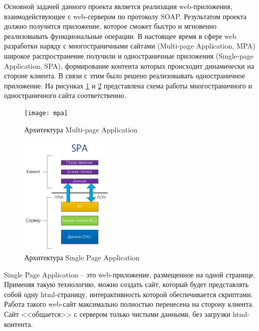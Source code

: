 

Основной задачей данного проекта является реализация web-приложения, взаимодействующее с web-сервером по протоколу SOAP. Результатом проекта должно получится приложение, которое сможет быстро и мгновенно реализовывать функциональные операции. В настоящее время в сфере web разработки наряду с многостраничными сайтами (Multi-page Application, MPA) широкое распространение получили и одностраничные приложения (Single-page Application, SPA), формирование контента которых происходит динамически на стороне клиента. В связи с этим было решено реализовывать одностраничное приложение. На рисунках  \ref{mpa} и  \ref{spa} представлена схема работы многостраничного и одностраничного сайта соответственно.

\begin{figure}[h]
\center\texttt{[image: mpa]}
\caption{Архитектура Multi-page Application}\label{mpa}
\end{figure}

\begin{figure}[h]
\center\includegraphics[width=0.4\textwidth]{spa}
\caption{Архитектура Single Page Application}\label{spa}
\end{figure}

Single Page Application -- это web-приложение, размещенное на одной странице. Применяя такую технологию, можно создать сайт,  который будет представлять собой одну html-страницу, интерактивность которой обеспечивается скриптами. Работа такого web-сайт максимально полностью перенесена на сторону клиента. Сайт <<общается>> с сервером только чистыми данными, без загрузки html-контента.
 
